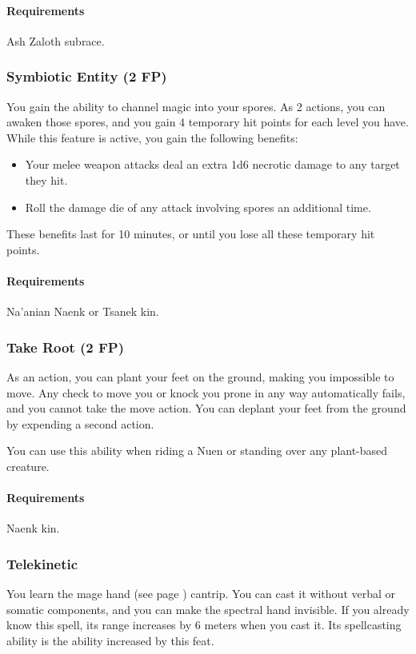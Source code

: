     \paragraph{Requirements} Ash Zaloth subrace.
\subsubsection{Symbiotic Entity (2 FP)} \label{feat::symbioticentity}
    You gain the ability to channel magic into your spores.
    As 2 actions, you can awaken those spores, and you gain 4 temporary hit points for each level you have.
    While this feature is active, you gain the following benefits:
    \begin{itemize}
        \item Your melee weapon attacks deal an extra 1d6 necrotic damage to any target they hit.
        \item Roll the damage die of any attack involving spores an additional time.
    \end{itemize}
    These benefits last for 10 minutes, or until you lose all these temporary hit points.
    \paragraph{Requirements} Na'anian Naenk or Tsanek kin.
\subsubsection{Take Root (2 FP)} \label{feat::takeroot}
    As an action, you can plant your feet on the ground, making you impossible to move.
    Any check to move you or knock you prone in any way automatically fails, and you cannot take the move action.
    You can deplant your feet from the ground by expending a second action.

    You can use this ability when riding a Nuen or standing over any plant-based creature.
    \paragraph{Requirements} Naenk kin.
\subsubsection{Telekinetic} \label{feat::telekinetic}
    You learn the mage hand (see page \pageref{spell:magehand}) cantrip.
    You can cast it without verbal or somatic components, and you can make the spectral hand invisible.
    If you already know this spell, its range increases by 6 meters when you cast it.
    Its spellcasting ability is the ability increased by this feat.

